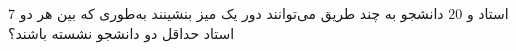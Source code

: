 \EXERCISE
$7$
استاد و
$20$
دانشجو به چند طریق می‌توانند دور یک میز بنشینند به‌طوری که بین هر دو استاد حداقل دو دانشجو نشسته باشند؟